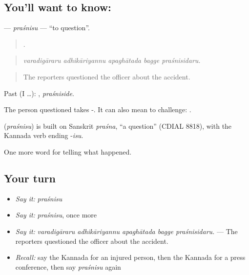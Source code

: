 \subsection*{You'll want to know: }
\textbf{} — \emph{praśnisu} — \textquotedblleft{}to question\textquotedblright{}.

\begin{quote}
    .
\end{quote}

\begin{quote}
\emph{varadigāraru adhikāriyannu apaghātada bagge praśnisidaru.}
\end{quote}

\begin{quote}
The reporters questioned the officer about the accident.
\end{quote}

Past (I …): , \emph{praśniside}.

The person questioned takes -. It can also mean to challenge:  .

\begin{cousinweb}
\textbf{} (\emph{praśnisu}) is built on Sanskrit \emph{praśna}, \textquotedblleft{}a question\textquotedblright{} (CDIAL 8818), with the Kannada verb ending -\emph{isu}.
\end{cousinweb}

\begin{grammarlens}[title={What you've built}]
One more word for telling what happened.
\end{grammarlens}

\subsection*{Your turn}
\begin{itemize}
\raggedright
  \item \emph{Say it:} \emph{praśnisu}
  \item \emph{Say it:} \emph{praśnisu}, once more
  \item \emph{Say it:} \emph{varadigāraru adhikāriyannu apaghātada bagge praśnisidaru.} — The reporters questioned the officer about the accident.
  \item \emph{Recall:} say the Kannada for an injured person, then the Kannada for a press conference, then say \emph{praśnisu} again
\end{itemize}

